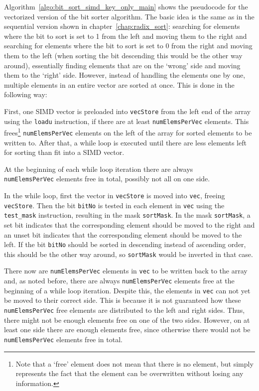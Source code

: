 \documentclass[12pt, a4paper, openright, twoside]{tiarbeit}
\begin{document}
Algorithm~\ref{algo:bit_sort_simd_key_only_main} shows the pseudocode for
the vectorized version of the bit sorter algorithm.
The basic idea is the same as in the sequential version shown in chapter~\ref{chap:radix_sort}:
searching for elements where the bit to sort is set to 1 from the left and
moving them to the right and searching for elements where the bit to sort is
set to 0 from the right and moving them to the left (when sorting the bit
descending this would be the other way around), essentially finding elements
that are on the `wrong' side and moving them to the `right' side.
However, instead of handling the elements one by one, multiple elements
in an entire
vector are sorted at once. This is done in the following way:

First, one SIMD vector is preloaded into \texttt{vecStore} from the left
end of the array using the \texttt{loadu} instruction, if there are at
least \texttt{numElemsPerVec} elements.
This frees\footnote
{Note that a `free' element does not mean that there is no element, but simply
  represents the fact that the element can be overwritten without losing
  any information.} \texttt{numElemsPerVec} elements on the left of
the array for sorted elements to be written to.
After that, a while loop is executed until there are less elements
left for sorting than fit into a SIMD vector.

At the beginning of each while loop iteration there are always\\
\texttt{numElemsPerVec} elements free in total, possibly not all on one side.

In the while loop, first the vector in \texttt{vecStore} is moved into
\texttt{vec}, freeing \texttt{vecStore}. Then the bit \texttt{bitNo} is tested
in each element in
\texttt{vec} using the \texttt{test\_mask} instruction,
resulting in the mask \texttt{sortMask}.
In the mask \texttt{sortMask}, a set bit indicates that the corresponding
element should be moved to the right and an unset bit indicates
that the corresponding element should be moved to the left.
If the bit \texttt{bitNo} should be sorted in descending instead of ascending
order, this should be the other way around, so \texttt{sortMask} would be
inverted in that case.

There now are \texttt{numElemsPerVec} elements in \texttt{vec} to be written
back to the array and, as noted
before, there are always \texttt{numElemsPerVec} elements free at the beginning
of a while loop iteration.
Despite this, the elements in \texttt{vec} can not yet be moved to their correct
side. This is because it is not guaranteed how these \texttt{numElemsPerVec}
free elements are distributed to the left and right sides.
Thus, there might not be enough elements free on one of the two sides.
However, on at least one side there are enough elements free, since otherwise
there would not be \texttt{numElemsPerVec} elements free in total.
\end{document}
